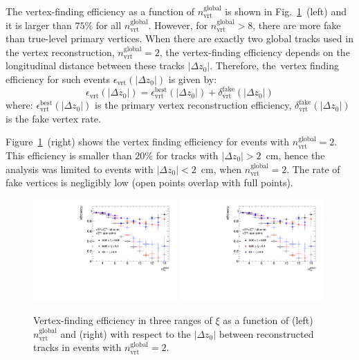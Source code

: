 The vertex-finding efficiency as a function of $n^\textrm{global}_\textrm{vrt}$ is shown in  Fig.~\ref{fig:vertexEffi}~(left) and   it is larger than $75\%$ for all $n^\textrm{global}_\textrm{vrt}$. However, for $n^\textrm{global}_\textrm{vrt}>8$, there are more fake  than true-level primary vertices. When there are exactly two global tracks used in the vertex reconstruction, $n^\textrm{global}_\textrm{vrt}=2$, the vertex-finding efficiency depends on the longitudinal distance between these tracks $|\Delta z_0|$. Therefore, the~vertex finding efficiency for such events $\epsilon_\textrm{vrt}\left(|\Delta z_0|\right)$ is given by:
\begin{equation}
\epsilon_\textrm{vrt}\left(|\Delta z_0|\right)=\epsilon_\textrm{vrt}^\textrm{best}\left(|\Delta z_0|\right)+\delta_\textrm{vrt}^\textrm{fake}\left(|\Delta z_0|\right)
\end{equation}
where: $\epsilon_\textrm{vrt}^\textrm{best}\left(|\Delta z_0|\right)$ is the primary vertex reconstruction efficiency, $\delta_\textrm{vrt}^\textrm{fake}\left(|\Delta z_0|\right)$ is the fake vertex rate.

Figure~\ref{fig:vertexEffi}~(right) shows the vertex finding efficiency for events with $n^\textrm{global}_\textrm{vrt}=2$. This efficiency is smaller than $20\%$ for tracks with $|\Delta z_0|>2$~cm, hence the analysis was limited to  events with  $|\Delta z_0|<2$~cm, when $n^\textrm{global}_\textrm{vrt}=2$.  The rate of fake vertices is negligibly low (open points overlap with full points).
\begin{figure}[h!]
	\centering
		\includegraphics[width=0.49\textwidth,page=1]{chapters/chrgSTAR/img/vertex/vertexEffi_ksi.pdf}
		\includegraphics[width=0.49\textwidth,page=8]{chapters/chrgSTAR/img/vertex/vertexEffi_ksi.pdf}
		\caption{Vertex-finding efficiency in three ranges of $\xi$ as a function of  (left) $n^\textrm{global}_\textrm{vrt}$ and (right) with respect to the $|\Delta z_0|$ between reconstructed tracks in events with $n^\textrm{global}_\textrm{vrt}=2$. }
		\label{fig:vertexEffi}
\end{figure}

